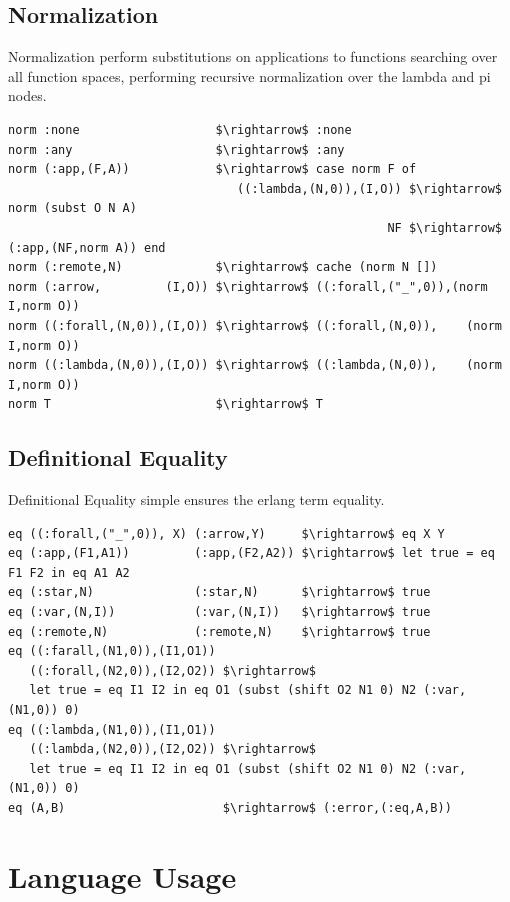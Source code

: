 \documentclass[11pt,oneside]{article}
\begin{document}
\subsection{Normalization}

Normalization perform substitutions on applications to functions searching
over all function spaces, performing recursive normalization over the lambda and pi nodes.

\begin{lstlisting}[mathescape=true]
norm :none                   $\rightarrow$ :none
norm :any                    $\rightarrow$ :any
norm (:app,(F,A))            $\rightarrow$ case norm F of
                                ((:lambda,(N,0)),(I,O)) $\rightarrow$ norm (subst O N A)
                                                     NF $\rightarrow$ (:app,(NF,norm A)) end
norm (:remote,N)             $\rightarrow$ cache (norm N [])
norm (:arrow,         (I,O)) $\rightarrow$ ((:forall,("_",0)),(norm I,norm O))
norm ((:forall,(N,0)),(I,O)) $\rightarrow$ ((:forall,(N,0)),    (norm I,norm O))
norm ((:lambda,(N,0)),(I,O)) $\rightarrow$ ((:lambda,(N,0)),    (norm I,norm O))
norm T                       $\rightarrow$ T
\end{lstlisting}

\subsection{Definitional Equality}

Definitional Equality simple ensures the erlang term equality.

\begin{lstlisting}[mathescape=true]
eq ((:forall,("_",0)), X) (:arrow,Y)     $\rightarrow$ eq X Y
eq (:app,(F1,A1))         (:app,(F2,A2)) $\rightarrow$ let true = eq F1 F2 in eq A1 A2
eq (:star,N)              (:star,N)      $\rightarrow$ true
eq (:var,(N,I))           (:var,(N,I))   $\rightarrow$ true
eq (:remote,N)            (:remote,N)    $\rightarrow$ true
eq ((:farall,(N1,0)),(I1,O1))
   ((:forall,(N2,0)),(I2,O2)) $\rightarrow$
   let true = eq I1 I2 in eq O1 (subst (shift O2 N1 0) N2 (:var,(N1,0)) 0)
eq ((:lambda,(N1,0)),(I1,O1))
   ((:lambda,(N2,0)),(I2,O2)) $\rightarrow$
   let true = eq I1 I2 in eq O1 (subst (shift O2 N1 0) N2 (:var,(N1,0)) 0)
eq (A,B)                      $\rightarrow$ (:error,(:eq,A,B))
\end{lstlisting}

\newpage
\section{Language Usage}
\end{document}

